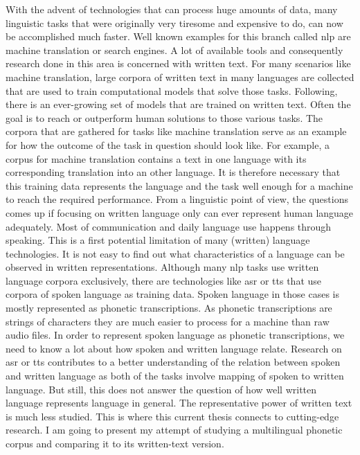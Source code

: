 
\label{chap:1_intro}

With the advent of technologies that can process huge amounts of data, many linguistic tasks that were originally very tiresome and expensive to do, can now be accomplished much faster. Well known examples for this branch called \ac{nlp} are machine translation or search engines. A lot of available tools and consequently research done in this area is concerned with written text. For many scenarios like machine translation, large corpora of written text in many languages are collected that are used to train computational models that solve those tasks. Following, there is an ever-growing set of models that are trained on written text. Often the goal is to reach or outperform human solutions to those various tasks. The corpora that are gathered for tasks like machine translation serve as an example for how the outcome of the task in question should look like. For example, a corpus for machine translation contains a text in one language with its corresponding translation into an other language. It is therefore necessary that this training data represents the language and the task well enough for a machine to reach the required performance. From a linguistic point of view, the questions comes up if focusing on written language only can ever represent human language adequately. Most of communication and daily language use happens through speaking. This is a first potential limitation of many (written) language technologies. It is not easy to find out what characteristics of a language can be observed in written representations. Although many \ac{nlp} tasks use written language corpora exclusively, there are technologies like \ac{asr} or \ac{tts} that use corpora of spoken language as training data. Spoken language in those cases is mostly represented as phonetic transcriptions. As phonetic transcriptions are strings of characters they are much easier to process for a machine than raw audio files. In order to represent spoken language as phonetic transcriptions, we need to know a lot about how spoken and written language relate. Research on \ac{asr} or \ac{tts} contributes to a better understanding of the relation between spoken and written language as both of the tasks involve mapping of spoken to written language. But still, this does not answer the question of how well written language represents language in general. The representative power of written text is much less studied. This is where this current thesis connects to cutting-edge research. I am going to present my attempt of studying a multilingual phonetic corpus and comparing it to its written-text version. 


